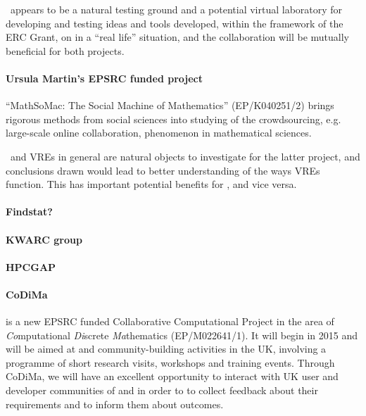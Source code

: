 \TheProject\ appears to be a natural
testing ground and a potential virtual laboratory for developing and testing
ideas and tools developed, within the framework of the ERC Grant, 
on in a ``real life'' situation, and the collaboration
will be mutually beneficial for both projects.

 
\paragraph{Ursula Martin's EPSRC funded project}
``MathSoMac: The Social Machine of Mathematics'' (EP/K040251/2) brings rigorous methods from social
sciences into studying of the crowdsourcing, e.g. large-scale online
collaboration, phenomenon in mathematical sciences. 

\TheProject\ and VREs in general are natural objects to investigate for the
latter project, and conclusions drawn would lead to better understanding
of the ways VREs function. This has important potential benefits for \TheProject, and
vice versa. 



\paragraph{Findstat?}

\paragraph{KWARC group}

\paragraph{HPCGAP}

\paragraph{CoDiMa} is a new EPSRC funded Collaborative Computational Project 
in the area of {\em Co}mputational {\em Di}screte {\em Ma}thematics (EP/M022641/1).
It will begin in 2015 and will be aimed at \GAP and \Sage community-building 
activities in the UK, involving a programme of short research visits, workshops 
and training events. Through CoDiMa, we will have an excellent opportunity to
interact with UK user and developer communities of \GAP and \Sage in order to
to collect feedback about their requirements and to inform them about \TheProject 
outcomes.

